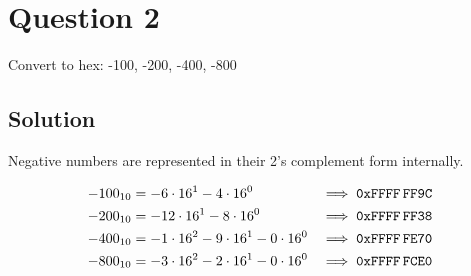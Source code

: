 \section*{Question 2}

Convert to hex: -100, -200, -400, -800

\subsection*{Solution}

Negative numbers are represented in their 2's complement form internally.

\begin{align*}
    -100_{10} & = -6 \cdot 16^1 - 4 \cdot 16^0                & \implies \texttt{0xFFFF\,FF9C} \\
    -200_{10} & = -12 \cdot 16^1 - 8 \cdot 16^0               & \implies \texttt{0xFFFF\,FF38} \\
    -400_{10} & = -1 \cdot 16^2 - 9 \cdot 16^1 - 0 \cdot 16^0 & \implies \texttt{0xFFFF\,FE70} \\
    -800_{10} & = -3 \cdot 16^2 - 2 \cdot 16^1 - 0 \cdot 16^0 & \implies \texttt{0xFFFF\,FCE0}
\end{align*}

